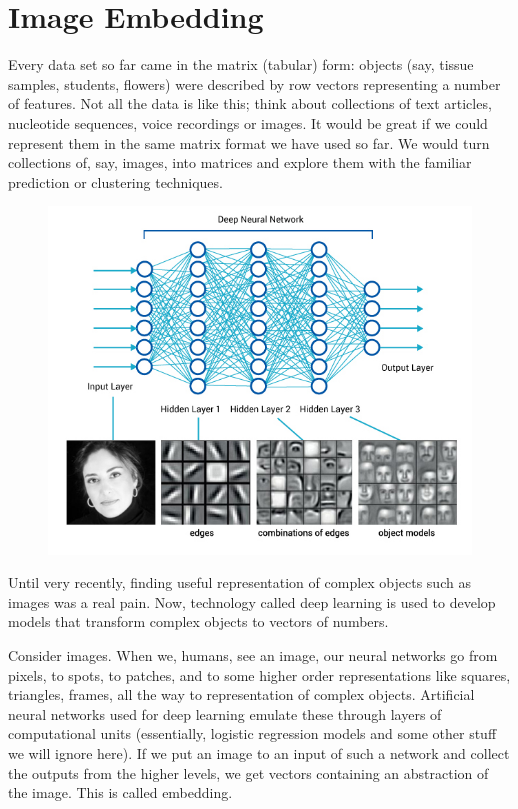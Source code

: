 \chapter{Image Embedding}
\label{ch:image-embedding}

Every data set so far came in the matrix (tabular) form: objects (say, tissue samples, students, flowers) were described by row vectors representing a number of features. Not all the data is like this; think about collections of text articles, nucleotide sequences, voice recordings or images.  It would be great if we could represent them in the same matrix format we have used so far. We would turn collections of, say, images, into matrices and explore them with the familiar prediction or clustering techniques.

\begin{figure}
    \includegraphics[scale=0.5]{blog_deeplearning.jpg}
    \label{fig:deep-learning}
\end{figure}

Until very recently, finding useful representation of complex objects such as images was a real pain. Now, technology called deep learning is used to develop models that transform complex objects to vectors of numbers.

Consider images. When we, humans, see an image, our neural networks go from pixels, to spots, to patches, and to some higher order representations like squares, triangles, frames, all the way to representation of complex objects. Artificial neural networks used for deep learning emulate these through layers of computational units (essentially, logistic regression models and some other stuff we will ignore here). If we put an image to an input of such a network and collect the outputs from the higher levels, we get vectors containing an abstraction of the image. This is called embedding.


